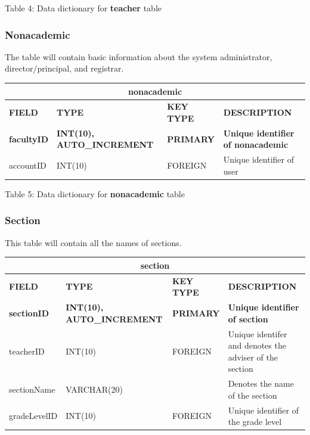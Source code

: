 \documentclass[11pt,a4paper,titlepage]{article}
\begin{document}
\vspace{.5cm}
\begin{center}
    Table 4: Data dictionary for \textbf{teacher} table
\end{center}


\subsubsection{Nonacademic}

The table will contain basic information about the system administrator, director/principal, and registrar.

\vspace{1cm}
\begin{longtable}{ |p{2.5cm}|p{4.5cm}|p{2.5cm}|p{3cm}|  }
    \hline
    \multicolumn{4}{|c|}{\textbf{nonacademic}} \\
    \hline
    \textbf{FIELD}&\textbf{TYPE}&\textbf{KEY TYPE}&\textbf{DESCRIPTION}\\
    \hline
    \textbf{facultyID}   & \textbf{INT(10), AUTO\_INCREMENT}  & \textbf{PRIMARY} & \textbf{Unique identifier of nonacademic}\\ \hline
    accountID& INT(10) & FOREIGN & Unique identifier of user \\ \hline
\end{longtable}

\vspace{.5cm}
\begin{center}
    Table 5: Data dictionary for \textbf{nonacademic} table
\end{center}


\subsubsection{Section}

This table will contain all the names of sections.

\vspace{1cm}
\begin{longtable}{ |p{2.5cm}|p{4.5cm}|p{2.5cm}|p{3cm}|  }
    \hline
    \multicolumn{4}{|c|}{\textbf{section}} \\
    \hline
    \textbf{FIELD}&\textbf{TYPE}&\textbf{KEY TYPE}&\textbf{DESCRIPTION}\\
    \hline
    \textbf{sectionID}   & \textbf{INT(10), AUTO\_INCREMENT} & \textbf{PRIMARY} & \textbf{Unique identifier of section}\\ \hline
    teacherID & INT(10) & FOREIGN & Unique identifer and denotes the adviser of the section \\ \hline
    sectionName & VARCHAR(20) & & Denotes the name of the section \\ \hline
    gradeLevelID & INT(10) & FOREIGN & Unique identifier of the grade level \\ \hline
\end{longtable}
\end{document}
